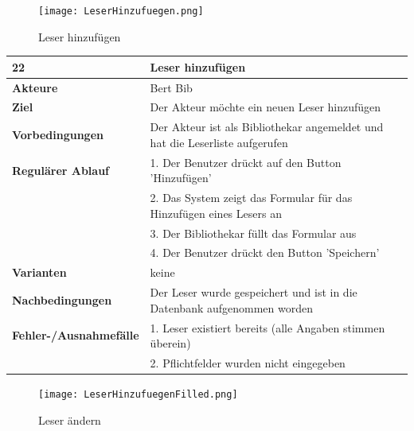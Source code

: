 \documentclass[fontsize=12pt,paper=a4,twoside]{scrartcl}
\begin{document}
\begin{figure}
	[H] \caption{Leser hinzufügen} 
	\texttt{[image: LeserHinzufuegen.png]} \label{pic:LeserHinzufuegen} 
\end{figure}
\begin{table}
	[H] \label{22} 
	\begin{tabular}
		{|l|p{10cm}|} \hline \textbf{22} & \textbf{Leser hinzufügen} \\
		\hline \textbf{Akteure} & Bert Bib\\
		\hline \textbf{Ziel} & Der Akteur möchte ein neuen Leser hinzufügen \\
		\hline \textbf{Vorbedingungen} & Der Akteur ist als Bibliothekar angemeldet und hat die Leserliste aufgerufen\\
		\hline \textbf{Regulärer Ablauf} & 1. Der Benutzer drückt auf den Button 'Hinzufügen' \\
		&2. Das System zeigt das Formular für das Hinzufügen eines Lesers an\\
		&3. Der Bibliothekar füllt das Formular aus\\
		&4. Der Benutzer drückt den Button 'Speichern'\\
		\hline \textbf{Varianten} & keine \\
		\hline \textbf{Nachbedingungen} & Der Leser wurde gespeichert und ist in die Datenbank aufgenommen worden\\
		\hline \textbf{Fehler-/Ausnahmefälle} & 1. Leser existiert bereits (alle Angaben stimmen überein)\\
		&2. Pflichtfelder wurden nicht eingegeben\\
		\hline 
	\end{tabular}
\end{table}
\begin{figure}
	[H] \caption{Leser ändern} 
	\texttt{[image: LeserHinzufuegenFilled.png]} \label{pic:LeserAendern} 
\end{figure}
\end{document}
